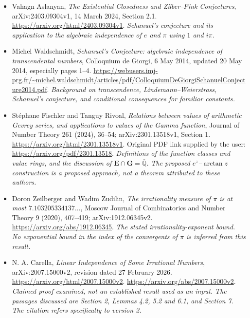 \documentclass[11pt]{article}
\newcommand{\Qbar}{\overline{\mathbb Q}}
\begin{document}
\begin{itemize}
 \item[E4] Vahagn Aslanyan, \emph{The Existential Closedness and Zilber--Pink
 Conjectures}, arXiv:2403.09304v1, 14 March 2024, Section 2.1.
 \url{https://arxiv.org/html/2403.09304v1}.
 \textit{Schanuel's conjecture and its application to the algebraic
 independence of $e$ and $\pi$ using $1$ and $i\pi$.}

 \item[E5] Michel Waldschmidt, \emph{Schanuel's Conjecture: algebraic
 independence of transcendental numbers}, Colloquium de Giorgi,
 6 May 2014, updated 20 May 2014, especially pages 1--4.
 \url{https://webusers.imj-prg.fr/~michel.waldschmidt/articles/pdf/ColloquiumDeGiorgiSchanuelConjecture2014.pdf}.
 \textit{Background on transcendence, Lindemann--Weierstrass, Schanuel's
 conjecture, and conditional consequences for familiar constants.}

 \item[E6] St\'ephane Fischler and Tanguy Rivoal,
 \emph{Relations between values of arithmetic Gevrey series, and
 applications to values of the Gamma function}, Journal of Number Theory
 261 (2024), 36--54; arXiv:2301.13518v1, Section 1.
 \url{https://arxiv.org/html/2301.13518v1}.
 Original PDF link supplied by the user:
 \url{https://arxiv.org/pdf/2301.13518}.
 \textit{Definitions of the function classes and value rings, and the
 discussion of $\mathbf E\cap\mathbf G=\Qbar$. The proposed
 $e^z$--$\arctan z$ construction is a proposed approach,
 not a theorem attributed to these authors.}

 \item[E7] Doron Zeilberger and Wadim Zudilin,
 \emph{The irrationality measure of $\pi$ is at most
 $7.103205334137\ldots$}, Moscow Journal of Combinatorics and Number Theory
 9 (2020), 407--419; arXiv:1912.06345v2.
 \url{https://arxiv.org/abs/1912.06345}.
 \textit{The stated irrationality-exponent bound. No exponential bound in
 the index of the convergents of $\pi$ is inferred from this result.}

 \item[D1] N. A. Carella, \emph{Linear Independence of Some Irrational
 Numbers}, arXiv:2007.15000v2, revision dated 27 February 2026.
 \url{https://arxiv.org/html/2007.15000v2}.
 \url{https://arxiv.org/abs/2007.15000v2}.
 \textit{Claimed proof examined, not an established result used as an
 input. The passages discussed are Section 2, Lemmas 4.2, 5.2 and 6.1,
 and Section 7. The citation refers specifically to version 2.}
\end{itemize}
\end{document}
